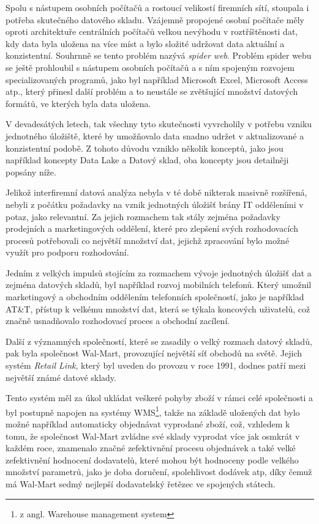 \documentclass[
  digital,     %
  twoside,     %
  lof,         %
  lot,         %
]{fithesis4}
\begin{document}
Spolu s nástupem osobních počítačů a rostoucí velikostí firemních sítí, stoupala i potřeba skutečného datového skladu. Vzájemně propojené osobní počítače měly oproti architektuře centrálních počítačů velkou nevýhodu v roztříštěnosti dat, kdy data byla uložena na více míst a bylo složité udržovat data aktuální a konzistentní. Souhrnně se tento problém nazývá \emph{spider web}. \parencite[s.~6]{Inmon2005} Problém spider webu se ještě prohloubil s nástupem osobních počítačů a s ním spojeným rozvojem specializovaných programů, jako byl například Microsoft Excel, Microsoft Access atp., který přinesl další problém a to neustále se zvětšující množství datových formátů, ve kterých byla data uložena.\parencite{Foote19042018}

V devadesátých letech, tak všechny tyto skutečnosti vyvrcholily v potřebu vzniku jednotného úložiště, které by umožňovalo data snadno udržet v aktualizované a konzistentní podobě. Z tohoto důvodu vzniklo několik konceptů, jako jsou například koncepty Data Lake a Datový sklad, oba koncepty jsou detailněji popsány níže.

Jelikož interfiremní datová analýza nebyla v té době nikterak masivně rozšířená, nebyli z počátku požadavky na vznik jednotných úložišť brány IT odděleními v potaz, jako relevantní. Za jejich rozmachem tak stály zejména požadavky prodejních a marketingových oddělení, které pro zlepšení svých rozhodovacích procesů potřebovali co největší množství dat, jejichž zpracování bylo možné využít pro podporu rozhodování. \parencite{Inmon2021}

Jedním z velkých impulsů stojícím za rozmachem vývoje jednotných úložišť dat a zejména datových skladů, byl například rozvoj mobilních telefonů. Který umožnil marketingový a obchodním oddělením telefonních společností, jako je například AT\&T, přístup k velkému množství dat, která se týkala koncových uživatelů, což značně usnadňovalo rozhodovací proces a obchodní zacílení.\parencite{Inmon2021}

Další z významných společností, které se zasadily o velký rozmach datový skladů, pak byla společnost Wal-Mart, provozující největší síť obchodů na světě. Jejich systém \emph{Retail Link}, který byl uveden do provozu v roce 1991, dodnes patří mezi největší známé datové sklady.\parencite{Gallaugher2018}

Tento systém měl za úkol ukládat veškeré pohyby zboží v rámci celé společnosti a byl postupně napojen na systémy WMS\footnote{z angl. Warehouse management system}, takže na základě uložených dat bylo možné například automaticky objednávat vyprodané zboží, což, vzhledem k tomu, že společnost Wal-Mart zvládne své sklady vyprodat více jak osmkrát v každém roce, znamenalo značné zefektivnění procesu objednávek a také velké zefektivnění hodnocení dodavatelů, které mohou být hodnoceny podle velkého množství parametrů, jako je doba doručení, spolehlivost dodávek atp, díky čemuž má Wal-Mart sedmý nejlepší dodavatelský řetězec ve spojených státech.\parencite{Gallaugher2018}  
\end{document}

